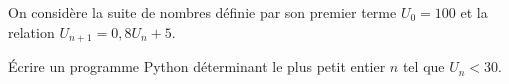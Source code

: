 \begin{exo}
	On considère la suite de nombres définie par son premier terme $U_0 = 100$ et la relation $U_{n+1} = 0{,}8 U_n + 5$.

	Écrire un programme Python déterminant le plus petit entier $n$ tel que $U_n < 30$.
\end{exo}
